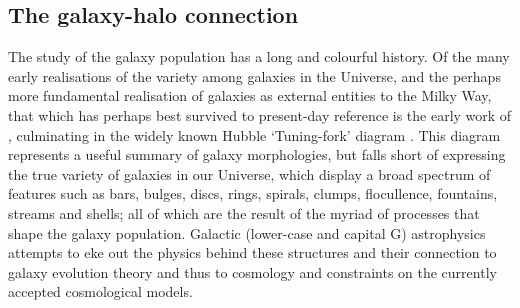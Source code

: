 \subsection{The galaxy-halo connection}
\label{sec:galaxyhaloconnect}
The study of the galaxy population has a long and colourful history. Of the many early realisations of the variety among galaxies in the Universe, and the perhaps more fundamental realisation of galaxies as external entities to the Milky Way, that which has perhaps best survived to present-day reference is the early work of \citet{1926ApJ....64..321H}, culminating in the widely known Hubble `Tuning-fork' diagram \citep[e.g.][]{1936rene.book.....H,1961hag..book.....S}. This diagram represents a useful summary of galaxy morphologies, but falls short of expressing the true variety of galaxies in our Universe, which display a broad spectrum of features such as bars, bulges, discs, rings, spirals, clumps, flocullence, fountains, streams and shells; all of which are the result of the myriad of processes that shape the galaxy population. Galactic (lower-case and capital G) astrophysics attempts to eke out the physics behind these structures and their connection to galaxy evolution theory and thus to cosmology and constraints on the currently accepted cosmological models. 

